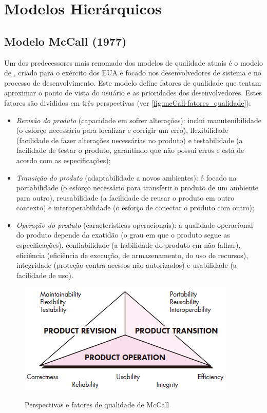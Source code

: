 \documentclass[
	12pt,				%
	openright,			%
	oneside,			%
	a4paper,			%
	english,			%
	brazil,				%
	]{abntex2}
\begin{document}
\section{Modelos Hierárquicos}
\subsection{Modelo McCall (1977)}

Um dos predecessores mais renomado dos modelos de qualidade atuais é o modelo de , criado para o exército dos EUA e focado nos desenvolvedores de sistema e no processo de desenvolvimento. Este modelo define fatores de qualidade que tentam aproximar o ponto de vista do usuário e as prioridades dos desenvolvedores. Estes fatores são divididos em três perspectivas (ver \autoref{fig:mcCall-fatores_qualidade}):

\begin{itemize}
    \item \emph{Revisão do produto} (capacidade em sofrer alterações): inclui manutenibilidade (o esforço necessário para localizar e corrigir um erro), flexibilidade (facilidade de fazer alterações necessárias no produto) e testabilidade (a facilidade de testar o produto, garantindo que não possui erros e está de acordo com as especificações);
    \item \emph{Transição do produto} (adaptabilidade a novos ambientes): é focado na portabilidade (o esforço necessário para transferir o produto de um ambiente para outro), reusabilidade (a facilidade de reusar o produto em outro contexto) e interoperabilidade (o esforço de conectar o produto com outro);
    \item \emph{Operação do produto} (características operacionais): a qualidade operacional do produto depende da exatidão (o grau em que o produto segue as especificações), confiabilidade (a habilidade do produto em não falhar), eficiência (eficiência de execução, de armazenamento, do uso de recursos), integridade (proteção contra acessos não autorizados) e usabilidade (a facilidade de uso).
\end{itemize}

\begin{figure}[h]
    \centering
    \caption{Perspectivas e fatores de qualidade de McCall}
    \graphicspath{ {./graphics/} }
    \includegraphics[scale=0.8]{mcCall-fatores_qualidade}
    \label{fig:mcCall-fatores_qualidade}
\end{figure}
\end{document}
